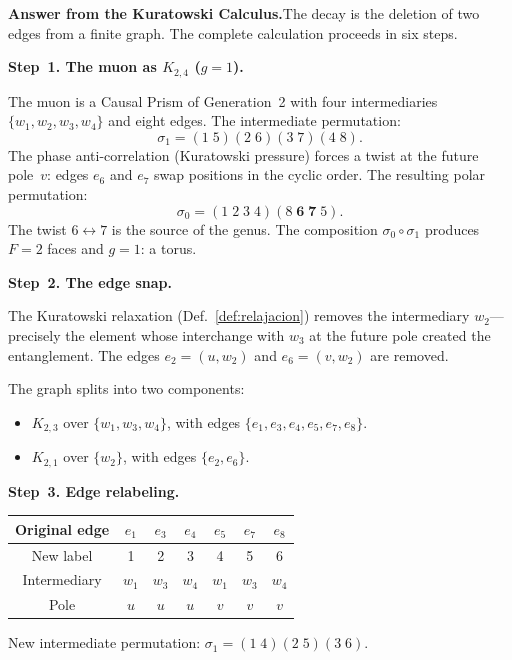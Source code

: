 \noindent\textbf{Answer from the Kuratowski Calculus.}\enspace The decay
is the deletion of two edges from a finite graph. The complete
calculation proceeds in six steps.

\bigskip
\noindent
\textbf{Step~1. The muon as $K_{2,4}$ ($g = 1$).}

The muon is a Causal Prism of Generation~2 with four intermediaries
$\{w_1, w_2, w_3, w_4\}$ and eight edges. The intermediate permutation:
\[
  \sigma_1 = (1\;5)(2\;6)(3\;7)(4\;8).
\]
The phase anti-correlation (Kuratowski pressure) forces a twist at the
future pole~$v$: edges $e_6$ and $e_7$ swap positions in the cyclic
order. The resulting polar permutation:
\[
  \sigma_0 = (1\;2\;3\;4)(8\;\mathbf{6\;7}\;5).
\]
The twist $6 \leftrightarrow 7$ is the source of the genus. The
composition $\sigma_0 \circ \sigma_1$ produces $F = 2$ faces and
$g = 1$: a torus.

\bigskip
\noindent
\textbf{Step~2. The edge snap.}

The Kuratowski relaxation (Def.~\ref{def:relajacion}) removes the
intermediary $w_2$---precisely the element whose interchange with $w_3$
at the future pole created the entanglement. The edges
$e_2 = (u, w_2)$ and $e_6 = (v, w_2)$ are removed.

The graph splits into two components:
\begin{itemize}
  \item $K_{2,3}$ over $\{w_1, w_3, w_4\}$, with edges
        $\{e_1, e_3, e_4, e_5, e_7, e_8\}$.
  \item $K_{2,1}$ over $\{w_2\}$, with edges $\{e_2, e_6\}$.
\end{itemize}

\bigskip
\noindent
\textbf{Step~3. Edge relabeling.}

\begin{center}
\renewcommand{\arraystretch}{1.15}
\begin{tabular}{ccccccc}
\toprule
Original edge & $e_1$ & $e_3$ & $e_4$ & $e_5$ & $e_7$ & $e_8$ \\
\midrule
New label  & 1 & 2 & 3 & 4 & 5 & 6 \\
Intermediary      & $w_1$ & $w_3$ & $w_4$ & $w_1$ & $w_3$ & $w_4$ \\
Pole            & $u$ & $u$ & $u$ & $v$ & $v$ & $v$ \\
\bottomrule
\end{tabular}
\end{center}
New intermediate permutation:
$\sigma_1 = (1\;4)(2\;5)(3\;6)$.


